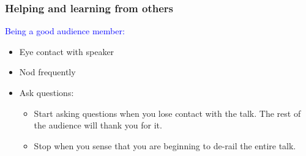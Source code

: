 \documentclass[aspectratio=43,10pt,ucs]{beamer} %
\begin{document}
\begin{frame}
  \frametitle{Helping and learning from others}

  \textcolor{blue}{Being a good audience member:}
  \begin{itemize}
  \item Eye contact with speaker
  \item Nod frequently
  \item Ask questions:
    \begin{itemize}
    \item Start asking questions when you lose contact with the
      talk. The rest of the audience will thank you for it.
    \item Stop when you sense that you are beginning to de-rail the
      entire talk.
    \end{itemize}
  \end{itemize}

  \vspace*{3em}


\end{frame}
\end{document}
